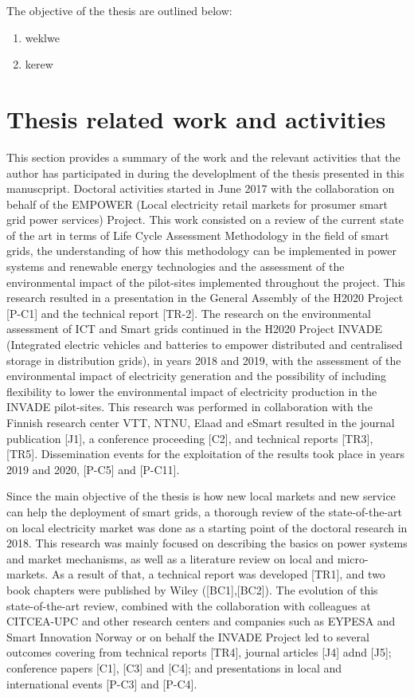 The objective of the thesis are outlined below: 

\begin{enumerate}
\item weklwe
\item kerew
\end{enumerate}


\newpage 
\section{Thesis related work and activities}
This section provides a summary of the work and the relevant activities that the author has participated in during the developlment of the thesis presented in this manuscpript.  	
Doctoral activities started in June 2017 with the collaboration on behalf of the EMPOWER (Local electricity retail markets for prosumer smart grid power services) Project. This work consisted on a review of the current state of the art in terms of Life Cycle Assessment Methodology in the field of smart grids, the understanding of how this methodology can be implemented in power systems and renewable energy technologies and the assessment of the environmental impact of the pilot-sites implemented throughout the project. This research resulted in a presentation in the General Assembly of the H2020 Project [P-C1] and the technical report [TR-2]. The research on the environmental assessment of ICT and Smart grids continued in the H2020 Project INVADE (Integrated electric vehicles and batteries to empower distributed and centralised storage in distribution grids), in years  2018 and 2019, with the assessment of the environmental impact of electricity generation and the possibility of including flexibility to lower the environmental impact of electricity production in the INVADE pilot-sites. This research was performed in collaboration with the Finnish research center VTT, NTNU, Elaad and eSmart resulted in the journal publication [J1], a conference proceeding [C2], and technical reports [TR3], [TR5]. Dissemination events for the exploitation of the results took place in years 2019 and 2020, [P-C5] and [P-C11]. 

Since the main objective of the thesis is how new local markets and new service can help the deployment of smart grids, a thorough review of the state-of-the-art on local electricity market was done as a starting point of the doctoral research in 2018. This research was mainly focused on describing the basics on power systems and market mechanisms, as well as a literature review on local and micro-markets. As a result of that, a technical report was developed [TR1], and two book chapters were published by Wiley ([BC1],[BC2]).  The evolution of this state-of-the-art review, combined with the collaboration with colleagues at CITCEA-UPC and other research centers and companies such as EYPESA and Smart Innovation Norway or on behalf the INVADE Project led to several outcomes covering from technical reports [TR4], journal articles [J4] adnd [J5]; conference papers [C1], [C3] and [C4]; and presentations in local and international events [P-C3] and [P-C4].  

